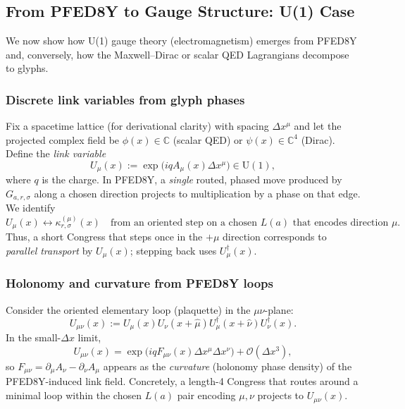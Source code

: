 \documentclass[pdflatex,sn-mathphys-num]{sn-jnl}
\theoremstyle{thmstyleone}
\theoremstyle{thmstyletwo}
\theoremstyle{thmstylethree}
\begin{document}
\subsection{From PFED8Y to Gauge Structure: U(1) Case}
\label{subsec:u1}

We now show how U(1) gauge theory (electromagnetism) emerges from PFED8Y and, conversely, how the Maxwell--Dirac or scalar QED Lagrangians decompose to glyphs.

\subsubsection{Discrete link variables from glyph phases}

Fix a spacetime lattice (for derivational clarity) with spacing $\Delta x^\mu$ and let the projected complex field be $\phi(x) \in \mathbb{C}$ (scalar QED) or $\psi(x) \in \mathbb{C}^4$ (Dirac). Define the \emph{link variable}
\begin{equation}
    U_\mu(x) := \exp\big(iq A_\mu(x) \Delta x^\mu\big) \in \mathrm{U}(1),
\end{equation}
where $q$ is the charge. In PFED8Y, a \emph{single} routed, phased move produced by $G_{a,r,\sigma}$ along a chosen direction projects to multiplication by a phase on that edge. We identify
\begin{equation}
    U_\mu(x) \longleftrightarrow \kappa_{r,\sigma}^{(\mu)}(x)
    \quad \text{from an oriented step on a chosen } L(a) \text{ that encodes direction } \mu.
\end{equation}
Thus, a short Congress that steps once in the $+\mu$ direction corresponds to \emph{parallel transport} by $U_\mu(x)$; stepping back uses $U_\mu^\dagger(x)$.

\subsubsection{Holonomy and curvature from PFED8Y loops}

Consider the oriented elementary loop (plaquette) in the $\mu\nu$-plane:
\begin{equation}
    U_{\mu\nu}(x) := U_\mu(x) U_\nu(x+\hat{\mu}) U_\mu^\dagger(x+\hat{\nu}) U_\nu^\dagger(x).
\end{equation}
In the small-$\Delta x$ limit,
\begin{equation}
    U_{\mu\nu}(x) = \exp\big(iq F_{\mu\nu}(x) \Delta x^\mu \Delta x^\nu\big) + \mathcal{O}(\Delta x^3),
\end{equation}
so $F_{\mu\nu} = \partial_\mu A_\nu - \partial_\nu A_\mu$ appears as the \emph{curvature} (holonomy phase density) of the PFED8Y-induced link field. Concretely, a length-4 Congress that routes around a minimal loop within the chosen $L(a)$ pair encoding $\mu,\nu$ projects to $U_{\mu\nu}(x)$.
\end{document}
